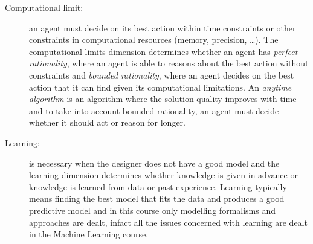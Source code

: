 \begin{description}
    \item [Computational limit: ] an agent must decide on its best action within time constraints or other
                                  constraints in computational resources (memory, precision, \dots).\newline
                                  The computational limits dimension determines whether an agent has
                                  \emph{perfect rationality}, where an agent is able to reasons about the best action
                                  without constraints and \emph{bounded rationality}, where an agent decides
                                  on the best action that it can find given its computational limitations.\newline
                                  An \emph{anytime algorithm} is an algorithm where the solution quality improves
                                  with time and to take into account bounded rationality, an agent must decide
                                  whether it should act or reason for longer.

    \item [Learning: ] is necessary when the designer does not have a good model and the learning dimension 
                       determines whether knowledge is given in advance or knowledge is learned from data or 
                       past experience.\newline
                       Learning typically means finding the best model that fits the data and
                       produces a good predictive model and in this course only modelling formalisms
                       and approaches are dealt, infact all the issues concerned with learning
                       are dealt in the Machine Learning course.


\end{description}
